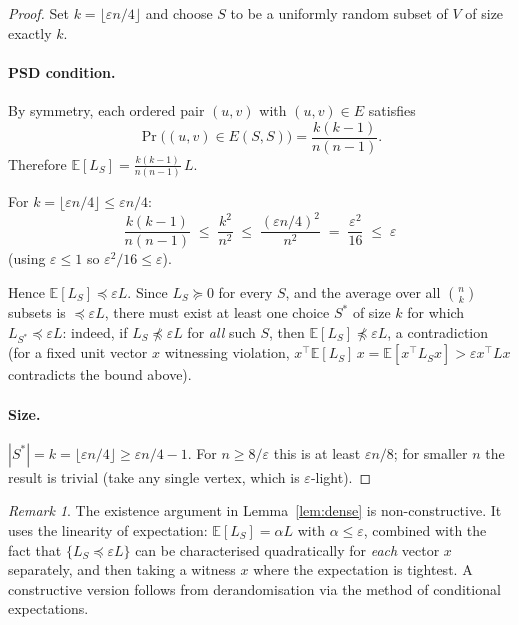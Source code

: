 \documentclass[12pt]{article}
\theoremstyle{definition}
\theoremstyle{remark}
\newtheorem{remark}[theorem]{Remark}
\begin{document}
\begin{proof}
Set $k = \lfloor \varepsilon n / 4 \rfloor$ and choose $S$ to be a uniformly
random subset of $V$ of size exactly $k$.

\paragraph{PSD condition.}
By symmetry, each ordered pair $(u,v)$ with $(u,v) \in E$ satisfies
\[
  \Pr\!\bigl((u,v)\in E(S,S)\bigr) = \frac{k(k-1)}{n(n-1)}.
\]
Therefore $\mathbb{E}[L_S] = \frac{k(k-1)}{n(n-1)}\,L$.

For $k = \lfloor \varepsilon n/4 \rfloor \le \varepsilon n/4$:
\[
  \frac{k(k-1)}{n(n-1)} \;\le\; \frac{k^2}{n^2}
  \;\le\; \frac{(\varepsilon n/4)^2}{n^2}
  \;=\; \frac{\varepsilon^2}{16} \;\le\; \varepsilon
\]
(using $\varepsilon \le 1$ so $\varepsilon^2/16 \le \varepsilon$).

Hence $\mathbb{E}[L_S] \preceq \varepsilon L$.  Since $L_S \succeq 0$ for every $S$,
and the average over all $\binom{n}{k}$ subsets is $\preceq \varepsilon L$, there
must exist at least one choice $S^*$ of size $k$ for which
$L_{S^*} \preceq \varepsilon L$: indeed, if $L_S \npreceq \varepsilon L$ for
\emph{all} such $S$, then $\mathbb{E}[L_S] \npreceq \varepsilon L$, a contradiction
(for a fixed unit vector $x$ witnessing violation,
$x^\top \mathbb{E}[L_S]\,x = \mathbb{E}[x^\top L_S x] > \varepsilon x^\top L x$
contradicts the bound above).

\paragraph{Size.}
$|S^*| = k = \lfloor \varepsilon n/4 \rfloor \ge \varepsilon n/4 - 1$.
For $n \ge 8/\varepsilon$ this is at least $\varepsilon n/8$; for smaller $n$ the result is
trivial (take any single vertex, which is $\varepsilon$-light).
\end{proof}

\begin{remark}
The existence argument in Lemma~\ref{lem:dense} is non-constructive.  It uses
the linearity of expectation: $\mathbb{E}[L_S] = \alpha L$ with $\alpha \le \varepsilon$,
combined with the fact that $\{L_S \preceq \varepsilon L\}$ can be characterised
quadratically for \emph{each} vector $x$ separately, and then taking a witness
$x$ where the expectation is tightest.  A constructive version follows from
derandomisation via the method of conditional expectations.
\end{remark}
\end{document}
